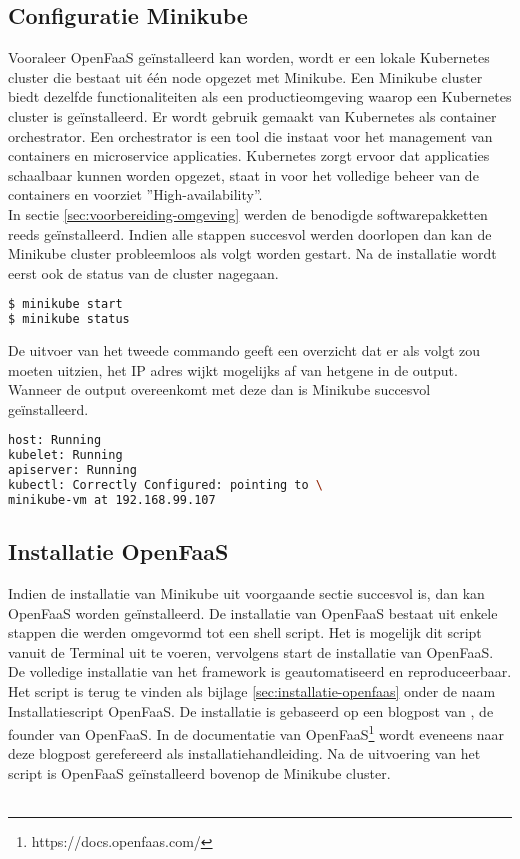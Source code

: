 \subsection{Configuratie Minikube}
Vooraleer OpenFaaS geïnstalleerd kan worden, wordt er een lokale Kubernetes cluster die bestaat uit één node opgezet met Minikube. Een Minikube cluster biedt dezelfde functionaliteiten als een productieomgeving waarop een Kubernetes cluster is geïnstalleerd. Er wordt gebruik gemaakt van Kubernetes als container orchestrator. Een orchestrator is een tool die instaat voor het management van containers en microservice applicaties. Kubernetes zorgt ervoor dat applicaties schaalbaar kunnen worden opgezet, staat in voor het volledige beheer van de containers en voorziet ''High-availability''.
\\
In sectie \ref{sec:voorbereiding-omgeving} werden de benodigde softwarepakketten reeds geïnstalleerd. Indien alle stappen succesvol werden doorlopen dan kan de Minikube cluster probleemloos als volgt worden gestart. Na de installatie wordt eerst ook de status van de cluster nagegaan.

\begin{lstlisting}[language=bash]
$ minikube start
$ minikube status
\end{lstlisting}

De uitvoer van het tweede commando geeft een overzicht dat er als volgt zou moeten uitzien, het IP adres wijkt mogelijks af van hetgene in de output. Wanneer de output overeenkomt met deze dan is Minikube succesvol geïnstalleerd.
\begin{lstlisting}[language=bash]
host: Running
kubelet: Running
apiserver: Running
kubectl: Correctly Configured: pointing to \ 
minikube-vm at 192.168.99.107
\end{lstlisting}

\subsection{Installatie OpenFaaS}
Indien de installatie van Minikube uit voorgaande sectie succesvol is, dan kan OpenFaaS worden geïnstalleerd. De installatie van OpenFaaS bestaat uit enkele stappen die werden omgevormd tot een shell script. Het is mogelijk dit script vanuit de Terminal uit te voeren, vervolgens start de installatie van OpenFaaS. De volledige installatie van het framework is geautomatiseerd en reproduceerbaar. Het script is terug te vinden als bijlage \ref{sec:installatie-openfaas} onder de naam Installatiescript OpenFaaS. De installatie is gebaseerd op een blogpost van \textcite{Ellis2017}, de founder van OpenFaaS. In de documentatie van OpenFaaS\footnote{https://docs.openfaas.com/} wordt eveneens naar deze blogpost gerefereerd als installatiehandleiding. Na de  uitvoering van het script is OpenFaaS geïnstalleerd bovenop de Minikube cluster.
\\\\


